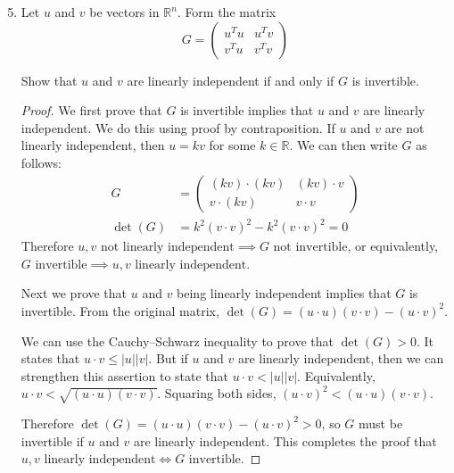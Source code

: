 \documentclass{article}
\newcommand{\Real}{\mathbb{R}}
\begin{document}
\begin{enumerate}

\setcounter{enumi}{4}
\item Let $u$ and $v$ be vectors in $\Real^n$. Form the matrix
\[ G = \left(
\begin{array}{cc}
u^T u & u^T v \\
v^T u & v^T v
\end{array}
\right) \]

Show that $u$ and $v$ are linearly independent if and only if $G$ is invertible.

\begin{proof}
We first prove that $G$ is invertible implies that $u$ and $v$ are linearly independent. We do this using proof by contraposition. If $u$ and $v$ are not linearly independent, then $u = kv$ for some $k \in \Real$. We can then write $G$ as follows:
\begin{align*}
G &= \left(
\begin{array}{cc}
(kv) \cdot (kv) & (kv) \cdot v \\
v \cdot (kv) & v \cdot v
\end{array}
\right) \\
\det(G) &= k^2 (v \cdot v)^2 - k^2 (v \cdot v)^2 = 0
\end{align*}
Therefore $u,v \mbox{ not linearly independent} \implies G \mbox{ not invertible}$, or equivalently, $G \mbox{ invertible} \implies u,v \mbox{ linearly independent}$.

Next we prove that $u$ and $v$ being linearly independent implies that $G$ is invertible. From the original matrix, $\det(G) = (u \cdot u) (v \cdot v) - (u \cdot v)^2$.

We can use the Cauchy--Schwarz inequality to prove that $\det(G) > 0$. It states that $u \cdot v \leq |u| |v|$. But if $u$ and $v$ are linearly independent, then we can strengthen this assertion to state that $u \cdot v < |u| |v|$. Equivalently, $u \cdot v < \sqrt{(u \cdot u)(v \cdot v)}$. Squaring both sides, $(u \cdot v)^2 < (u \cdot u)(v \cdot v)$.

Therefore $\det(G) = (u \cdot u) (v \cdot v) - (u \cdot v)^2 > 0$, so $G$ must be invertible if $u$ and $v$ are linearly independent. This completes the proof that $u,v \mbox{ linearly independent} \iff G \mbox{ invertible}$.
\end{proof}

\end{enumerate}
\end{document}
